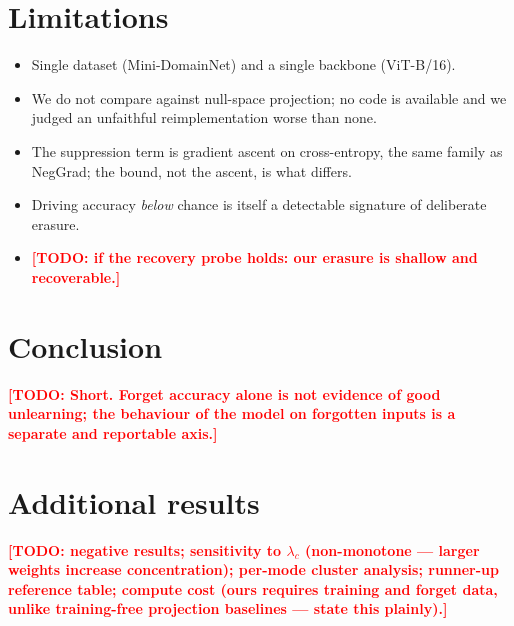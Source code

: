 \documentclass[10pt]{article}
\newcommand{\todo}[1]{\textcolor{red}{\textbf{[TODO: #1]}}}
\begin{document}
\section{Limitations}
\label{sec:limits}
\begin{itemize}
  \item Single dataset (Mini-DomainNet) and a single backbone (ViT-B/16).
  \item We do not compare against null-space projection; no code is available and
        we judged an unfaithful reimplementation worse than none.
  \item The suppression term is gradient ascent on cross-entropy, the same family
        as NegGrad; the bound, not the ascent, is what differs.
  \item Driving accuracy \emph{below} chance is itself a detectable signature of
        deliberate erasure.
  \item \todo{if the recovery probe holds: our erasure is shallow and recoverable.}
\end{itemize}

\section{Conclusion}
\todo{Short. Forget accuracy alone is not evidence of good unlearning; the
behaviour of the model on forgotten inputs is a separate and reportable axis.}




\appendix
\section{Additional results}
\todo{negative results; sensitivity to $\lambda_c$ (non-monotone --- larger
weights increase concentration); per-mode cluster analysis; runner-up reference
table; compute cost (ours requires training and forget data, unlike training-free
projection baselines --- state this plainly).}
\end{document}
